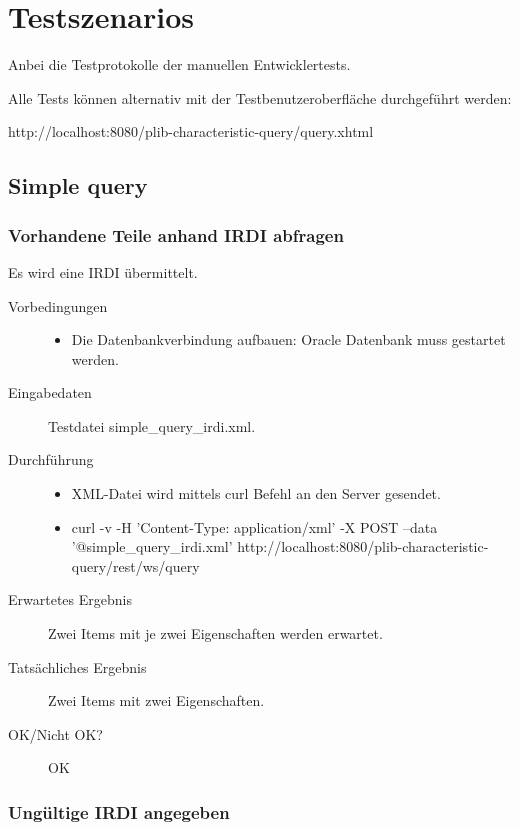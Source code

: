 \chapter{Testszenarios} \label{anh:testszenarios}

Anbei die Testprotokolle der manuellen Entwicklertests.

Alle Tests können alternativ mit der Testbenutzeroberfläche durchgeführt werden:

http://localhost:8080/plib-characteristic-query/query.xhtml

\section{Simple query}

\subsection{Vorhandene Teile anhand IRDI abfragen}

Es wird eine IRDI übermittelt.

\begin{description}
\item[Vorbedingungen] 
  \begin{itemize}
   \item Die Datenbankverbindung aufbauen: Oracle Datenbank muss gestartet werden.
  \end{itemize}
\item[Eingabedaten] Testdatei simple\_query\_irdi.xml. 
\item[Durchführung]
   \begin{itemize}
   \item XML-Datei wird mittels curl Befehl an den Server gesendet.
   \item curl -v -H 'Content-Type: application/xml' -X POST --data '@simple\_query\_irdi.xml' http://localhost:8080/plib-characteristic-query/rest/ws/query
  \end{itemize}
\item[Erwartetes Ergebnis] Zwei Items mit je zwei Eigenschaften werden erwartet. 
\item[Tatsächliches Ergebnis] Zwei Items mit zwei Eigenschaften.
\item[OK/Nicht OK?] OK
\end{description}


\subsection{Ungültige IRDI angegeben}

